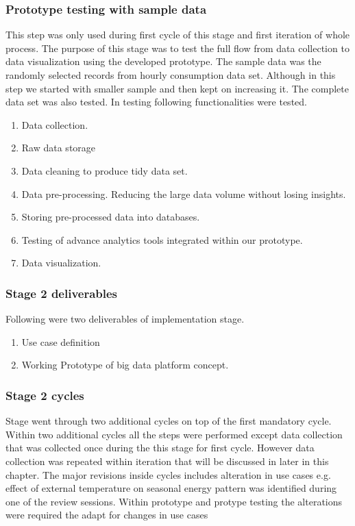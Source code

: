 \subsubsection{Prototype testing with sample data}
This step was only used during first cycle of this stage and first iteration of whole process. The purpose of this stage was to test the full flow from data collection to data visualization using the developed prototype. The sample data was the randomly selected records from hourly consumption data set. Although in this step we started with smaller sample and then kept on increasing it. The complete data set was also tested. In testing following functionalities were tested.
\begin{enumerate}
\item Data collection.
\item Raw data storage
\item Data cleaning to produce tidy data set.
\item Data pre-processing. Reducing the large data volume without losing insights. 
\item Storing pre-processed data into databases.
\item Testing of advance analytics tools integrated within our prototype.
\item Data visualization.  
\end{enumerate}
\subsubsection{Stage 2 deliverables}
Following were two deliverables of implementation stage.
\begin{enumerate}
\item Use case definition
\item Working Prototype of big data platform concept.
\end{enumerate}
\subsubsection{Stage 2 cycles}
Stage went through two additional cycles on top of the first mandatory cycle. Within two additional cycles all the steps were performed except data collection that was collected once during the this stage for first cycle. However data collection was repeated within iteration that will be discussed in later in this chapter.
The major revisions inside cycles includes alteration in use cases e.g. effect of external temperature on seasonal energy pattern was identified during one of the review sessions. Within prototype and protype testing the alterations were required the adapt for changes in use cases

